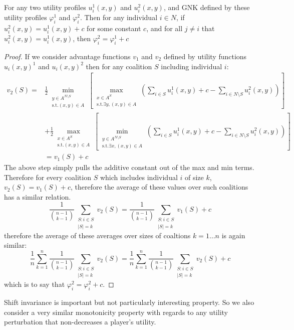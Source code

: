 \begin{theorem}
For any two utility profiles $u^1_i(x,y)$ and $u^2_i(x,y)$, and GNK defined by these utility profiles $\varphi_i^1$ and $\varphi_i^2$.
Then for any individual $i\in N$, if $u_i^2(x,y) = u_i^1(x,y)+c$ for some constant $c$, and for all $j\neq i$ that $u^2_i(x,y) = u^1_i(x,y)$, then $\varphi_i^2 = \varphi_i^1+c$ 
\end{theorem}
\begin{proof}
If we consider advantage functions $v_1$ and $v_2$ defined by utility functions $u_i(x,y)^1$ and $u_i(x,y)^2$ then for any coalition $S$ including individual $i$:
\begin{align}
v_2(S) = &
\frac{1}{2}\min_{\substack{y\in A^{N\setminus S} \\ \text{s.t.}(x,y)\in A}} \left[
\max_{\substack{x\in A^S \\ \text{s.t.}\exists y,(x,y)\in A}}
	\left(\sum_{i\in S} u^1_i(x,y)+c - \sum_{i\in N\setminus S}u_i^2(x,y)\right)\right]\nonumber\\
& +
\frac{1}{2}\max_{\substack{x\in A^S \\ \text{s.t.}(x,y)\in A}} \left[
\min_{\substack{y\in A^{N\setminus S} \\ \text{s.t.}\exists x,(x,y)\in A}}
	\left(\sum_{i\in S} u^1_i(x,y)+c - \sum_{i\in N\setminus S} u_i^2(x,y) \right) \right]\nonumber\\
&= v_1(S)+c\nonumber
\end{align}
The above step simply pulls the additive constant out of the max and min terms.
Therefore for every coalition $S$ which includes individual $i$ of size $k$, $v_2(S)=v_1(S)+c$, therefore the average of these values over such coalitions has a similar relation.
$$\frac{1}{\binom{n-1}{k-1}} \sum_{\substack{S:i\in S \\ |S|=k}}v_2(S) = \frac{1}{\binom{n-1}{k-1}} \sum_{\substack{S:i\in S \\ |S|=k}}v_1(S) + c$$
therefore the average of these averages over sizes of coaltions $k=1\dots n$ is again similar:
$$\frac{1}{n}\sum_{k=1}^n \frac{1}{\binom{n-1}{k-1}} \sum_{\substack{S:i\in S \\ |S|=k}}v_2(S) = \frac{1}{n}\sum_{k=1}^n \frac{1}{\binom{n-1}{k-1}} \sum_{\substack{S:i\in S \\ |S|=k}}v_2(S) + c$$
which is to say that $\varphi_i^2 = \varphi_i^2+c$.
\end{proof}

Shift invariance is important but not particularly interesting property.
So we also consider a very similar monotonicity property with regards to any utility perturbation that non-decreases a player's utility.

